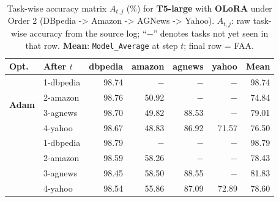 \begin{table}[ht]
\centering
\caption{%
  Task-wise accuracy matrix $A_{t,j}$ (\%) for \textbf{T5-large} with \textbf{OLoRA} under Order 2 (DBpedia -> Amazon -> AGNews -> Yahoo).
  $A_{t,j}$: raw task-wise accuracy from the source log; ``$-$'' denotes tasks not yet seen in that row.
  \textbf{Mean}: \texttt{Model\_Average} at step $t$; final row = FAA.
}
\label{tab:nlp_o2_t5large_olora}
\setlength{\tabcolsep}{4.0pt}
\renewcommand{\arraystretch}{0.92}
\scriptsize
\begin{tabular}{@{}l l r r r r r@{}}
\toprule
\textbf{Opt.} & \textbf{After $t$} & \textbf{dbpedia} & \textbf{amazon} & \textbf{agnews} & \textbf{yahoo} & \textbf{Mean} \\
\midrule
\multirow{4}{*}{\textbf{Adam}} & 1-dbpedia & 98.74 & $-$ & $-$ & $-$ & 98.74 \\
 & 2-amazon & 98.76 & 50.92 & $-$ & $-$ & 74.84 \\
 & 3-agnews & 98.70 & 49.82 & 88.53 & $-$ & 79.01 \\
 & 4-yahoo & 98.67 & 48.83 & 86.92 & 71.57 & 76.50 \\
\addlinespace[2pt]
\multirow{4}{*}{\textbf{SAM}} & 1-dbpedia & 98.79 & $-$ & $-$ & $-$ & 98.79 \\
 & 2-amazon & 98.59 & 58.26 & $-$ & $-$ & 78.43 \\
 & 3-agnews & 98.45 & 58.50 & 88.55 & $-$ & 81.83 \\
 & 4-yahoo & 98.54 & 55.86 & 87.09 & 72.89 & 78.60 \\
\bottomrule
\end{tabular}
\end{table}


